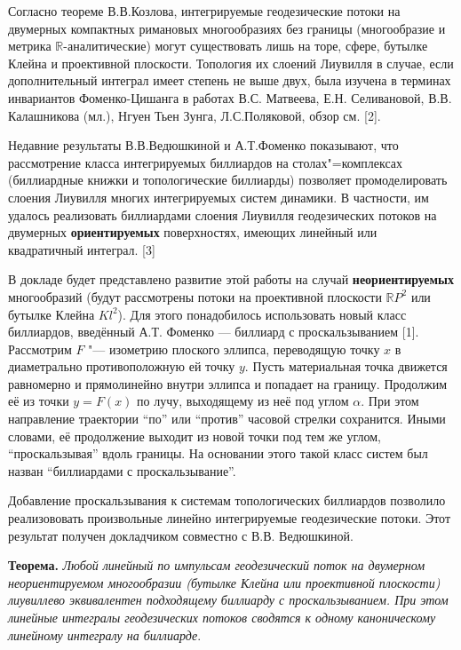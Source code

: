 
\vzmscaption
Согласно теореме В.В.Козлова, интегрируемые геодезические потоки на двумерных компактных римановых многообразиях без границы (многообразие и метрика $\mathbb{R}$-аналитические) могут существовать лишь на торе, сфере, бутылке Клейна и проективной плоскости. Топология их слоений Лиувилля в случае, если дополнительный интеграл имеет степень не выше двух, была изучена в терминах инвариантов Фоменко-Цишанга в работах В.С. Матвеева, Е.Н. Селивановой, В.В. Калашникова (мл.), Нгуен Тьен Зунга, Л.С.Поляковой, обзор см. [2].

Недавние результаты В.В.Ведюшкиной и А.Т.Фоменко показывают, что рассмотрение класса интегрируемых биллиардов на столах"=комплексах (биллиардные книжки и топологические биллиарды) позволяет промоделировать слоения Лиувилля многих интегрируемых систем динамики. В частности, им удалось реализовать биллиардами слоения Лиувилля геодезических потоков на двумерных \textbf{ориентируемых} поверхностях, имеющих линейный или квадратичный интеграл. [3]

В докладе будет представлено развитие этой работы на случай \textbf{неориентируемых} многообразий (будут рассмотрены потоки на проективной плоскости $\mathbb{R}P^2$ или бутылке Клейна $Kl^2$). Для этого понадобилось использовать новый класс биллиардов, введённый А.Т. Фоменко — биллиард с проскальзыванием [1]. Рассмотрим $F$ "--- изометрию плоского эллипса, переводящую точку $x$ в диаметрально противоположную ей точку $y.$ Пусть материальная точка движется равномерно и прямолинейно внутри эллипса и попадает на границу. Продолжим её из точки $y=F(x)$ по лучу, выходящему из неё под углом $\alpha$. При этом направление траектории ``по'' или ``против'' часовой стрелки сохранится. Иными словами, её продолжение выходит из новой точки под тем же углом, ``проскальзывая'' вдоль границы. На основании этого такой класс систем был назван ``биллиардами с проскальзывание''.

Добавление проскальзывания к системам топологических биллиардов позволило реализововать произвольные линейно интегрируемые геодезические потоки. Этот результат получен докладчиком совместно с В.В. Ведюшкиной.

{\bf Теорема.} {\it Любой линейный по импульсам геодезический поток на двумерном неориентируемом многообразии (бутылке Клейна или проективной плоскости) лиувиллево эквивалентен подходящему биллиарду с проскальзыванием. При этом линейные интегралы геодезических потоков сводятся к одному каноническому линейному интегралу на биллиарде}.

